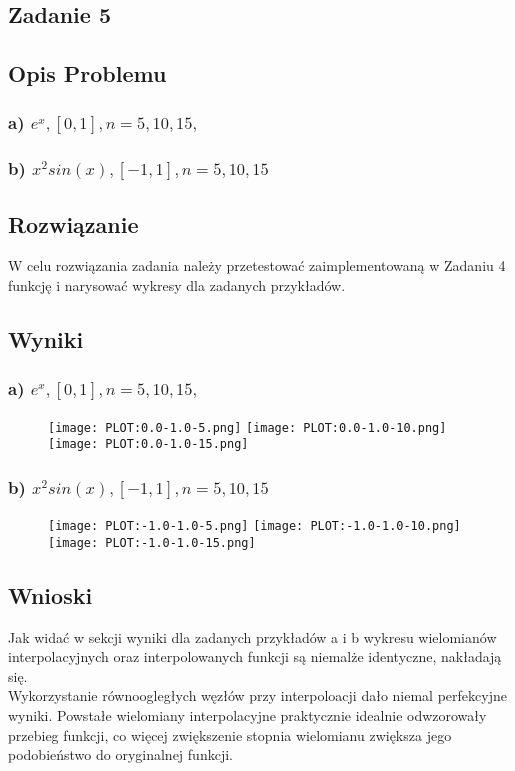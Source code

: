 \documentclass[11pt]{article}
\begin{document}
\begin{flushleft}
\newpage
\section{Zadanie 5}
\subsection{Opis Problemu}
\subsubsection{a) $ e^x,[0,1],n= 5,10,15,$}
\subsubsection{b) $ x^2sin(x),[−1,1],n= 5,10,15$}
\subsection{Rozwiązanie}
W celu rozwiązania zadania należy przetestować zaimplementowaną w Zadaniu 4 funkcję i narysować wykresy dla zadanych przykładów.
\subsection{Wyniki}
\subsubsection{a) $ e^x,[0,1],n= 5,10,15,$}
\begin{figure}[htbp]
\centering
\texttt{[image: PLOT:0.0-1.0-5.png]}
\texttt{[image: PLOT:0.0-1.0-10.png]}
\texttt{[image: PLOT:0.0-1.0-15.png]}
\end{figure}
\newpage
\subsubsection{b) $ x^2sin(x),[−1,1],n= 5,10,15$}
\begin{figure}[htbp]
\centering
\texttt{[image: PLOT:-1.0-1.0-5.png]}
\texttt{[image: PLOT:-1.0-1.0-10.png]}
\texttt{[image: PLOT:-1.0-1.0-15.png]}
\end{figure}

\subsection{Wnioski}
Jak widać w sekcji wyniki dla zadanych przykładów a i b wykresu wielomianów interpolacyjnych oraz interpolowanych funkcji są niemalże identyczne, nakładają się.\\ Wykorzystanie równoogległych węzłów przy interpoloacji dało niemal perfekcyjne wyniki. Powstałe wielomiany interpolacyjne praktycznie idealnie odwzorowały przebieg funkcji, co więcej zwiększenie stopnia wielomianu zwiększa jego podobieństwo do oryginalnej funkcji.


\end{flushleft}
\end{document}
